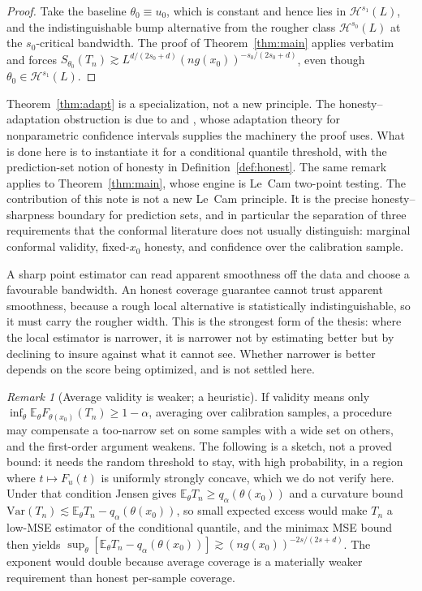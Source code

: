\documentclass[11pt]{article}
\theoremstyle{definition}
\theoremstyle{remark}
\newtheorem{remark}[theorem]{Remark}
\newcommand{\E}{\mathbb{E}}
\newcommand{\Hs}[1][s]{\mathcal{H}^{#1}}
\begin{document}
\begin{proof}
Take the baseline $\theta_0 \equiv u_0$, which is constant and hence lies in
$\Hs[s_1](L)$, and the indistinguishable bump alternative from the rougher class
$\Hs[s_0](L)$ at the $s_0$-critical bandwidth. The proof of Theorem~\ref{thm:main} applies
verbatim and forces $S_{\theta_0}(T_n) \gtrsim L^{d/(2s_0+d)}(n g(x_0))^{-s_0/(2s_0+d)}$,
even though $\theta_0 \in \Hs[s_1](L)$.
\end{proof}

Theorem~\ref{thm:adapt} is a specialization, not a new principle. The honesty--adaptation
obstruction is due to \citet{low1997nonparametric} and \citet{cai2004adaptation}, whose
adaptation theory for nonparametric confidence intervals supplies the machinery the proof
uses. What is done here is to instantiate it for a conditional quantile threshold, with the
prediction-set notion of honesty in Definition~\ref{def:honest}. The same remark applies to
Theorem~\ref{thm:main}, whose engine is Le~Cam two-point testing. The contribution of this
note is not a new Le~Cam principle. It is the precise honesty--sharpness boundary for
prediction sets, and in particular the separation of three requirements that the conformal
literature does not usually distinguish: marginal conformal validity, fixed-$x_0$ honesty,
and confidence over the calibration sample.

A sharp point estimator can read apparent
smoothness off the data and choose a favourable bandwidth. An honest coverage guarantee
cannot trust apparent smoothness, because a rough local alternative is statistically
indistinguishable, so it must carry the rougher width. This is the strongest form of the
thesis: where the local estimator is narrower, it is narrower not by estimating better but by
declining to insure against what it cannot see. Whether narrower is better depends on the
score being optimized, and is not settled here.

\begin{remark}[Average validity is weaker; a heuristic]\label{rem:avg}
If validity means only $\inf_\theta \E_\theta F_{\theta(x_0)}(T_n) \ge 1-\alpha$, averaging
over calibration samples, a procedure may compensate a too-narrow set on some samples with
a wide set on others, and the first-order argument weakens. The following is a sketch, not
a proved bound: it needs the random threshold to stay, with high probability, in a region
where $t\mapsto F_u(t)$ is uniformly strongly concave, which we do not verify here. Under
that condition Jensen gives $\E_\theta T_n \ge q_\alpha(\theta(x_0))$ and a curvature bound
$\mathrm{Var}(T_n) \lesssim \E_\theta T_n - q_\alpha(\theta(x_0))$, so small expected excess
would make $T_n$ a low-MSE estimator of the conditional quantile, and the minimax MSE bound
then yields
$\sup_\theta [\E_\theta T_n - q_\alpha(\theta(x_0))] \gtrsim (n g(x_0))^{-2s/(2s+d)}$. The
exponent would double because average coverage is a materially weaker requirement than
honest per-sample coverage.
\end{remark}
\end{document}
